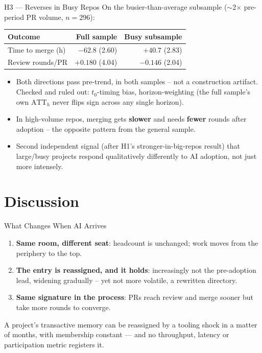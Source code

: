 \begin{frame}{H3 --- Reverses in Busy Repos}
On the busier-than-average subsample ($\sim$2$\times$ pre-period PR
volume, $n{=}296$):
\begin{table}
\centering
\small
\begin{tabular}{lrr}
\toprule
Outcome & Full sample & Busy subsample \\
\midrule
Time to merge (h) & $-62.8$ (2.60) & $+40.7$ (2.83) \\
Review rounds/PR & $+0.180$ (4.04) & $-0.146$ (2.04) \\
\bottomrule
\end{tabular}
\end{table}
\begin{itemize}
  \item Both directions pass pre-trend, in both samples -- not a
        construction artifact. Checked and ruled out: $t_0$-timing
        bias, horizon-weighting (the full sample's own $\text{ATT}_h$
        never flips sign across any single horizon).
  \item In high-volume repos, merging gets \textbf{slower} and needs
        \textbf{fewer} rounds after adoption -- the opposite pattern
        from the general sample.
  \item Second independent signal (after H1's stronger-in-big-repos
        result) that large/busy projects respond qualitatively
        differently to AI adoption, not just more intensely.
\end{itemize}
\end{frame}

\section{Discussion}

\begin{frame}{What Changes When AI Arrives}
\begin{enumerate}
  \item \textbf{Same room, different seat}: headcount is unchanged;
        work moves from the periphery to the top.
  \item \textbf{The entry is reassigned, and it holds}: increasingly
        not the pre-adoption lead, widening gradually -- yet not more
        volatile, a rewritten directory.
  \item \textbf{Same signature in the process}: PRs reach review and
        merge sooner but take more rounds to converge.
\end{enumerate}
\vspace{0.4em}
A project's transactive memory can be reassigned by a tooling shock in
a matter of months, with membership constant --- and no throughput,
latency or participation metric registers it.
\end{frame}

